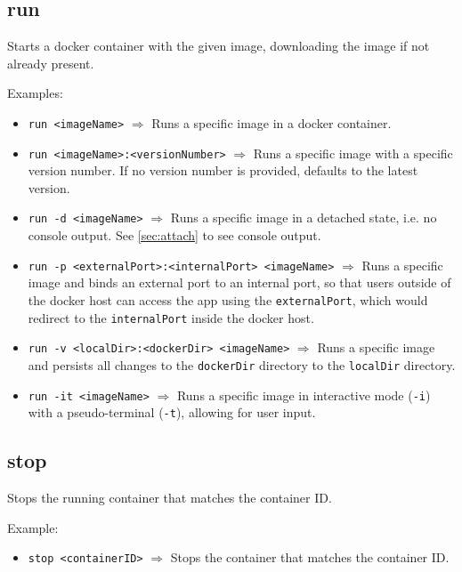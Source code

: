 \documentclass[a4paper, 12pt]{article}
\begin{document}
\subsection{run}

Starts a docker container with the given image, downloading the image if not
already present.

\vspace{0.5em}
Examples:
\begin{itemize}
	\item \texttt{run <imageName>} $\Rightarrow$ Runs a specific image
	in a docker container.
	\item \texttt{run <imageName>:<versionNumber>} $\Rightarrow$ Runs a specific image with
	a specific version number. If no version number is provided, defaults to
	the latest version.
	\item \texttt{run -d <imageName>} $\Rightarrow$ Runs a specific image in a detached
	state, i.e. no console output. See \ref{sec:attach} to see console output.
	\item \texttt{run -p <externalPort>:<internalPort> <imageName>}
	$\Rightarrow$ Runs a specific image and binds an external port to an internal
	port, so that users outside of the docker host can access the app using the
	\texttt{externalPort}, which would redirect to the \texttt{internalPort}
	inside the docker host.
	\item \texttt{run -v <localDir>:<dockerDir> <imageName>} $\Rightarrow$ Runs
	a specific image and persists all changes to the \texttt{dockerDir}
	directory to the \texttt{localDir} directory.
	\item \texttt{run -it <imageName>} $\Rightarrow$ Runs a specific image in
	interactive mode (\texttt{-i}) with a pseudo-terminal (\texttt{-t}), allowing
	for user input.
\end{itemize}

\subsection{stop}

Stops the running container that matches the container ID.

\vspace{0.5em}
Example:
\begin{itemize}
	\item \texttt{stop <containerID>} $\Rightarrow$ Stops the container that matches the
	container ID.
\end{itemize}
\end{document}
